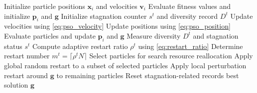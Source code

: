 
\begin{algorithm}[!t]
\caption{ARPSO-SRR}
\label{alg:arpso_srr}
\begin{algorithmic}[1]
\State Initialize particle positions $\mathbf{x}_i$ and velocities $\mathbf{v}_i$
\State Evaluate fitness values and initialize $\mathbf{p}_i$ and $\mathbf{g}$
\State Initialize stagnation counter $s^t$ and diversity record $D^t$
    \State Update velocities using \eqref{eq:pso_velocity}
    \State Update positions using \eqref{eq:pso_position}
    \State Evaluate particles and update $\mathbf{p}_i$ and $\mathbf{g}$
    \State Measure diversity $D^t$ and stagnation status $s^t$
        \State Compute adaptive restart ratio $\rho^t$ using \eqref{eq:restart_ratio}
        \State Determine restart number $m^t=\lceil\rho^tN\rceil$
        \State Select particles for search resource reallocation
        \State Apply global random restart to a subset of selected particles
        \State Apply local perturbation restart around $\mathbf{g}$ to remaining particles
        \State Reset stagnation-related records
    \EndIf
\EndWhile
\State \Return best solution $\mathbf{g}$
\end{algorithmic}
\end{algorithm}
